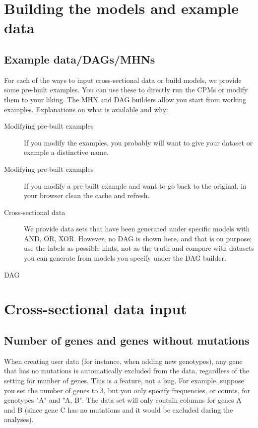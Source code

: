 \documentclass[a4paper,11pt]{article}
\begin{document}
\section{Building the models and example data}
\label{sec:build-models-example}

\subsection{Example data/DAGs/MHNs}
\label{sec:exampe-datadagsmhns}

For each of the ways to input cross-sectional data or build models, we provide some pre-built examples. You can use these to directly run the CPMs or modify them to your liking. The MHN and DAG builders allow you start from working examples. Explanations on what is available and why: 

\begin{description}
\item[Modifying pre-built examples] If you modify the examples, you probably will want to give your dataset or example a distinctive name.

\item[Modifying pre-built examples] If you modify a pre-built example and want to go back to the original, in your browser clean the cache and refresh.
  
\item[Cross-sectional data] We provide data sets that have been generated under specific models with AND, OR, XOR. However, no DAG is shown here, and that is on purpose; use the labels as possible hints, not as the truth and compare with datasets you can generate from models you specify under the DAG builder.

\item[DAG] 
  
\end{description}


\section{Cross-sectional data input}
\label{sec:cross-sectional-data}

\subsection{Number of genes and genes without mutations}
\label{sec:number-genes-genes}

 When creating user data (for instance, when adding new genotypes), any gene that has no mutations is automatically excluded from the data, regardless of the setting for number of genes. This is a feature, not a bug. For example, suppose you set the number of genes to 3, but you only specify frequencies, or counts, for genotypes "A" and "A, B". The data set will only contain columns for genes A and B (since gene C has no mutations and it would be excluded during the analyses).
\end{document}

